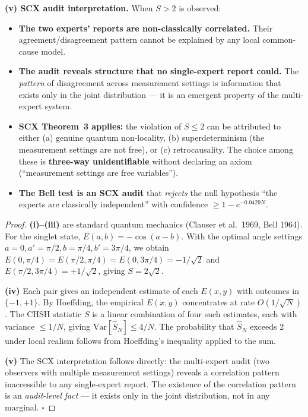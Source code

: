 \documentclass[11pt,a4paper]{article}
\theoremstyle{definition}
\theoremstyle{remark}
\newcommand{\Var}{\mathrm{Var}}
\begin{document}
\noindent\textbf{(v) SCX audit interpretation.}
When $S > 2$ is observed:
\begin{itemize}[nosep]
    \item \textbf{The two experts' reports are non-classically correlated.} Their agreement/disagreement pattern cannot be explained by any local common-cause model.
    \item \textbf{The audit reveals structure that no single-expert report could.} The \emph{pattern} of disagreement across measurement settings is information that exists only in the joint distribution --- it is an emergent property of the multi-expert system.
    \item \textbf{SCX Theorem~3 applies:} the violation of $S \leq 2$ can be attributed to either (a) genuine quantum non-locality, (b) superdeterminism (the measurement settings are not free), or (c) retrocausality. The choice among these is \textbf{three-way unidentifiable} without declaring an axiom (``measurement settings are free variables'').
    \item \textbf{The Bell test is an SCX audit} that \emph{rejects} the null hypothesis ``the experts are classically independent'' with confidence $\geq 1 - e^{-0.0429 N}$.
\end{itemize}

\begin{proof}
\textbf{(i)--(iii)} are standard quantum mechanics (Clauser et al.\ 1969, Bell 1964). For the singlet state, $E(a,b) = -\cos(a-b)$. With the optimal angle settings $a=0, a'=\pi/2, b=\pi/4, b'=3\pi/4$, we obtain $E(0,\pi/4) = E(\pi/2,\pi/4) = E(0,3\pi/4) = -1/\sqrt{2}$ and $E(\pi/2,3\pi/4) = +1/\sqrt{2}$, giving $S = 2\sqrt{2}$.

\textbf{(iv)} Each pair gives an independent estimate of each $E(x,y)$ with outcomes in $\{-1,+1\}$. By Hoeffding, the empirical $E(x,y)$ concentrates at rate $O(1/\sqrt{N})$. The CHSH statistic $S$ is a linear combination of four such estimates, each with variance $\leq 1/N$, giving $\Var[\hat{S}_N] \leq 4/N$. The probability that $\hat{S}_N$ exceeds 2 under local realism follows from Hoeffding's inequality applied to the sum.

\textbf{(v)} The SCX interpretation follows directly: the multi-expert audit (two observers with multiple measurement settings) reveals a correlation pattern inaccessible to any single-expert report. The existence of the correlation pattern is an \emph{audit-level fact} --- it exists only in the joint distribution, not in any marginal. $\square$
\end{proof}
\end{document}
